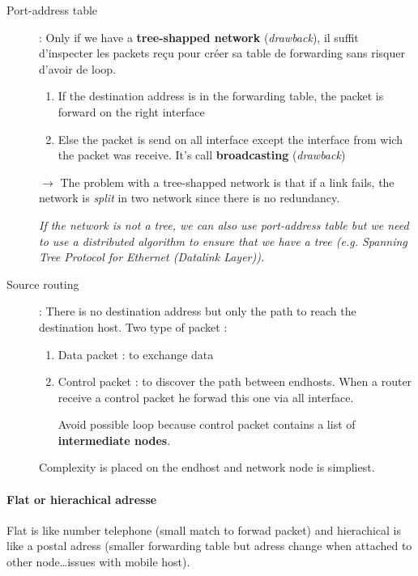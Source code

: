 \begin{description}
    \item[Port-address table] : Only if we have a \textbf{tree-shapped network} (\textit{drawback}), il suffit d'inspecter les packets reçu pour créer sa table de forwarding sans risquer d'avoir de loop.
        \begin{enumerate}
            \item If the destination address is in the forwarding table, the packet is
                forward on the right interface
            \item Else the packet is send on all interface except the interface
                from wich the packet was receive. It's call \textbf{broadcasting}
                (\textit{drawback})
        \end{enumerate}

        $\to$ The problem with a tree-shapped network is that if a link fails, the network is \textit{split} in two network since there is no redundancy.

        \begin{center}
            \textit{If the network is not a tree, we can also use port-address table but we need to use a distributed algorithm to ensure
            that we have a tree (e.g. Spanning Tree Protocol for Ethernet (Datalink Layer)).}
        \end{center}

    \item[Source routing] : There is no destination address but only the path to reach
        the destination host. Two type of packet :
        \begin{enumerate}
            \item Data packet : to exchange data
            \item Control packet : to discover the path between endhosts. 
                When a router receive a control packet he forwad this one via
                all interface.

                Avoid possible loop because control packet contains a list of \textbf{intermediate nodes}.
        \end{enumerate}
        Complexity is placed on the endhost and network node is simpliest.

\end{description}

\paragraph{Flat or hierachical adresse}
Flat is like number telephone (small match to forwad packet) and hierachical is like a postal adress (smaller forwarding table but adress change when attached to other node\ldots issues with mobile host).

